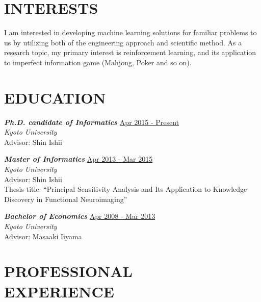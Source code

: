 \documentclass[margin, 10pt]{res} %
\begin{document}
\begin{resume}

\section{{\small INTERESTS}}
I am interested in developing machine learning solutions for familiar problems to us by utilizing both of the engineering approach and scientific method.
As a research topic, my primary interest is reinforcement learning, and its application to imperfect information game (Mahjong, Poker and so on).


\section{{\small EDUCATION}}

{\sl {\bf Ph.D. candidate of Informatics}} \hfill {\small \underline{Apr 2015 - Present}} \\
{\it Kyoto University} \\
Advisor: Shin Ishii

{\sl {\bf Master of Informatics}} \hfill {\small \underline{Apr 2013 - Mar 2015}}  \\
{\it Kyoto University} \\
Advisor: Shin Ishii \\
Thesis title: ``Principal Sensitivity Analysis and Its Application to Knowledge Discovery in Functional Neuroimaging''

{\sl {\bf Bachelor of Economics}} \hfill {\small \underline{Apr 2008 - Mar 2013}} \\
{\it Kyoto University} \\
Advisor: Masaaki Iiyama
  
\section{{\small PROFESSIONAL\\EXPERIENCE}}


\end{resume}
\end{document}
